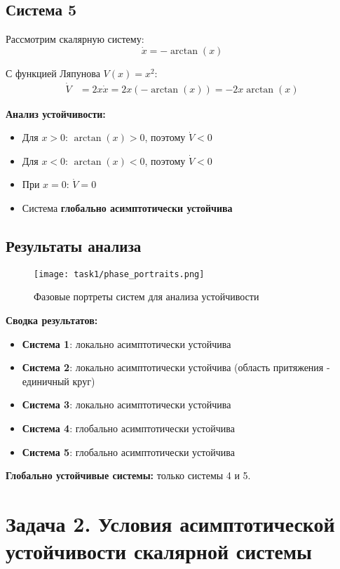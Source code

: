 \subsection*{Система 5}

Рассмотрим скалярную систему:
\begin{equation}
\dot{x} = -\arctan(x)
\end{equation}

С функцией Ляпунова $V(x) = x^2$:
\begin{align}
\dot{V} &= 2x \dot{x} = 2x(-\arctan(x)) = -2x\arctan(x)
\end{align}

\textbf{Анализ устойчивости:}
\begin{itemize}
\item Для $x > 0$: $\arctan(x) > 0$, поэтому $\dot{V} < 0$
\item Для $x < 0$: $\arctan(x) < 0$, поэтому $\dot{V} < 0$
\item При $x = 0$: $\dot{V} = 0$
\item Система \textbf{глобально асимптотически устойчива}
\end{itemize}

\subsection*{Результаты анализа}

\begin{figure}[H]
\centering
\texttt{[image: task1/phase\_portraits.png]}
\caption{Фазовые портреты систем для анализа устойчивости}
\label{fig:phase_portraits}
\end{figure}

\textbf{Сводка результатов:}
\begin{itemize}
\item \textbf{Система 1}: локально асимптотически устойчива
\item \textbf{Система 2}: локально асимптотически устойчива (область притяжения - единичный круг)
\item \textbf{Система 3}: локально асимптотически устойчива
\item \textbf{Система 4}: глобально асимптотически устойчива
\item \textbf{Система 5}: глобально асимптотически устойчива
\end{itemize}

\textbf{Глобально устойчивые системы:} только системы 4 и 5.

\section*{Задача 2. Условия асимптотической устойчивости скалярной системы}

